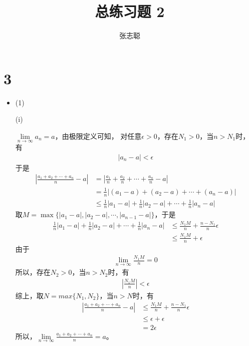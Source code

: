 \documentclass{article}
\begin{document}
\title{总练习题 2}
\author{张志聪}
\maketitle

\section*{3}

\begin{itemize}
  \item (1)

        (i)

        $\lim\limits_{n \to \infty} a_n = a$，由极限定义可知，
        对任意$\epsilon > 0$，存在$N_1 > 0$，当$n > N_1$时，有
        \begin{align*}
          |a_n - a| < \epsilon
        \end{align*}
        于是
        \begin{align*}
          |\frac{a_1 + a_2 + \cdots + a_n}{n} - a|
           & = |\frac{a_1}{n} + \frac{a_2}{n} + \cdots + \frac{a_n}{n} - a|                      \\
           & = \frac{1}{n}|(a_1 - a) + (a_2 - a) + \cdots + (a_n - a)|                           \\
           & \leq \frac{1}{n} |a_1 - a| + \frac{1}{n} |a_2 - a| + \cdots + \frac{1}{n} |a_n - a|
        \end{align*}
        取$M = \max\{|a_1 - a|, |a_2 - a|, \cdots, |a_{n-1} - a|\}$，于是
        \begin{align*}
          \frac{1}{n} |a_1 - a| + \frac{1}{n} |a_2 - a| + \cdots + \frac{1}{n} |a_n - a|
           & \leq \frac{N_1M}{n} + \frac{n - N_1}{n}\epsilon \\
           & \leq \frac{N_1M}{n} + \epsilon
        \end{align*}
        由于
        \begin{align*}
          \lim\limits_{n \to \infty} \frac{N_1M}{n} = 0
        \end{align*}
        所以，存在$N_2 > 0$，当$n > N_2$时，有
        \begin{align*}
          |\frac{N_1M}{n}| < \epsilon
        \end{align*}
        综上，取$N = max\{N_1, N_2\}$，当$n > N$时，有
        \begin{align*}
          |\frac{a_1 + a_2 + \cdots + a_n}{n} - a|
           & \leq \frac{N_1M}{n} + \frac{n - N_1}{n}\epsilon \\
           & \leq \epsilon + \epsilon                        \\
           & = 2\epsilon
        \end{align*}
        所以，$\lim\limits_{n \to \infty} \frac{a_1 + a_2 + \cdots + a_n}{n} = a$。


\end{itemize}
\end{document}

